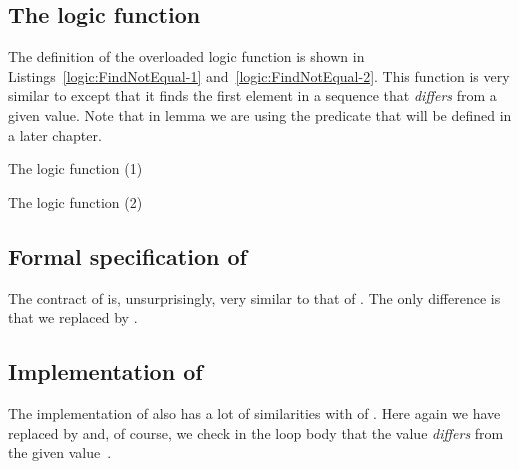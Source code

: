 \subsection{The logic function \FindNotEqual}

The definition of the overloaded logic function \FindNotEqual is shown in
Listings~\ref{logic:FindNotEqual-1} and~\ref{logic:FindNotEqual-2}.
This function is very similar to 
 except that it
finds the first element in a sequence that \emph{differs} from a given value.
%
Note that in lemma \FindNotEqualUnchanged we are using the predicate 
that will be defined in a later chapter.

\begin{logic}[hbt]
\begin{minipage}{\textwidth}

\end{minipage}
\caption{\label{logic:FindNotEqual-1}
   The logic function \FindNotEqual (1)}


\end{logic}

\FloatBarrier

\begin{logic}[hbt]
\begin{minipage}{\textwidth}

\end{minipage}
\caption{The logic function \FindNotEqual (2)}
\end{logic}

\FloatBarrier

\clearpage

\subsection{Formal specification of \findifnot}

The contract of  is, unsurprisingly,
very similar to that of .
The only difference is that we replaced 
 by 
.



\subsection{Implementation of \findifnot}

The implementation of 
also has a lot of similarities with of .
Here again we have replaced \Find by \FindNotEqual and, of course,
we check in the loop body that the value  \emph{differs} from the
given value~.



\clearpage

